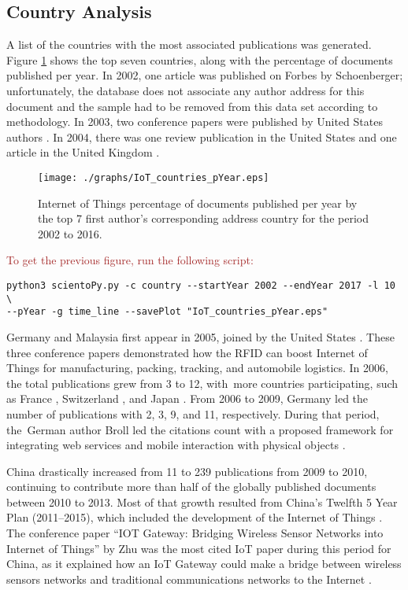 \documentclass[symmetry,article,accept,moreauthors,pdftex10pt,a4paper]{mdpi}
\newcommand{\figuresWidth}{0.65\textwidth}
\begin{document}
\subsection{Country Analysis}

A list of the countries with the most associated publications was generated. Figure \ref{fig_countries} shows the top seven countries, along with the percentage of documents published per year. In 2002, one article was published on Forbes by Schoenberger; unfortunately, the database does not associate any author address for this document and the sample had to be removed from this data set according to methodology. In 2003, two conference papers were published by United States authors \cite{Qiu20032661,Traversat2003}. In 2004, there was one review publication in the United States \cite{Gershenfeld200476} and one article in the United Kingdom \cite{ISI:000224027400006}. 

\begin{figure}[H]
	\centering
	\texttt{[image: ./graphs/IoT\_countries\_pYear.eps]}
	\caption{Internet of Things percentage of documents published per year by the top 7 first author's corresponding address country for the period 2002 to 2016.}
	\label{fig_countries}
\end{figure}

\noindent
\textcolor{brown}{To get the previous figure, run the following script:}\\
\begin{verbatim}
python3 scientoPy.py -c country --startYear 2002 --endYear 2017 -l 10 \
--pYear -g time_line --savePlot "IoT_countries_pYear.eps"
\end{verbatim}

Germany \cite{Bose2005} and Malaysia \cite{Norman2005} first appear in 2005, joined by the United States  \cite{Djassemi2005}. These three conference papers demonstrated how the RFID can boost Internet of Things for manufacturing, packing, tracking, and automobile logistics. In 2006, the total publications grew from 3 to 12, with~more countries participating, such as France \cite{4022056,1698342}, Switzerland \cite{Adelmann2006366,Lehtonen200677}, and Japan \cite{Futatsumori2006258}. From 2006 to 2009, Germany led the number of publications with 2, 3, 9, and 11, respectively. During that period, the~German author Broll led the citations count with a proposed framework for integrating web services and mobile interaction with physical objects \cite{5262929}.

China drastically increased from 11 to 239 publications from 2009 to 2010, continuing to contribute more than half of the globally published documents between 2010 to 2013. Most of that growth resulted from China's Twelfth 5 Year Plan (2011--2015), which included the development of the Internet of Things \cite{ISI:000304905300012}. The conference paper ``IOT Gateway: Bridging Wireless Sensor Networks into Internet of Things'' by Zhu was the most
cited IoT paper during this period for China, as it explained how an IoT Gateway could make a bridge between wireless sensors networks and traditional communications networks to the Internet \cite{Zhu2010347}.
\end{document}
